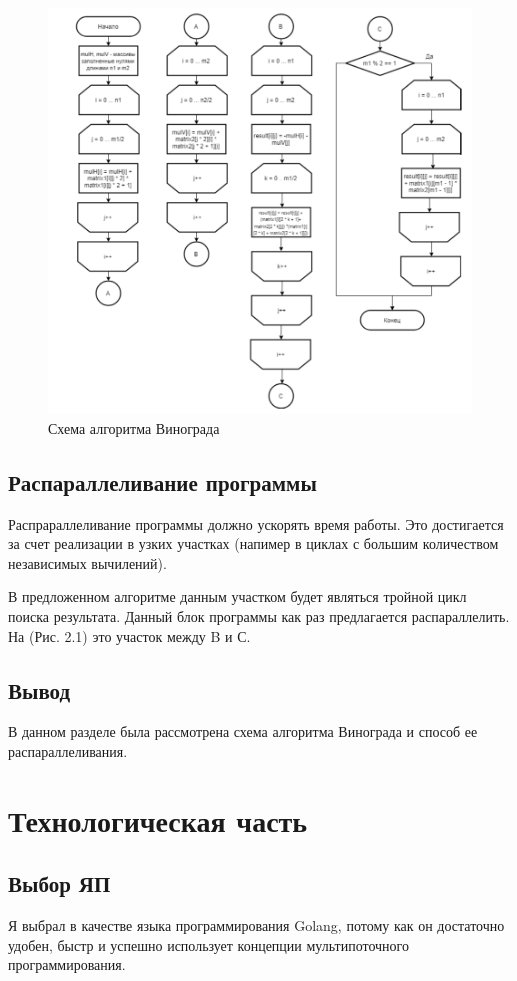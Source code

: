 \documentclass[12pt]{report}
\begin{document}
\begin{figure}[!htbp]
	\centering
	\includegraphics[width=1.3\linewidth]{winograd.png}
	\caption{Схема алгоритма Винограда}
	\label{fig:winogr}
\end{figure}

\section{Распараллеливание программы}
Распрараллеливание программы должно ускорять время работы. Это достигается за счет реализации в узких участках (напимер в циклах с большим количеством независимых вычилений).

В предложенном алгоритме данным участком будет являться тройной цикл поиска результата.
Данный блок программы как раз предлагается распараллелить.
На (Рис. 2.1) это участок между B и С. 

\section{Вывод}
В данном разделе была рассмотрена схема алгоритма Винограда и способ ее распараллеливания.

\chapter{Технологическая часть}
\section{Выбор ЯП}
Я выбрал в качестве языка программирования Golang, потому как он достаточно удобен, быстр и успешно использует концепции мультипоточного программирования.
\end{document}
